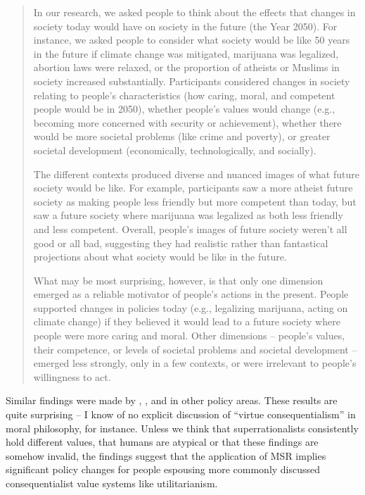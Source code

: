 \begin{quote}
In our research, we asked people to think about the effects that changes
in society today would have on society in the future (the Year 2050).
For instance, we asked people to consider what society would be like 50
years in the future if climate change was mitigated, marijuana was
legalized, abortion laws were relaxed, or the proportion of atheists or
Muslims in society increased substantially. Participants considered
changes in society relating to people's characteristics (how caring,
moral, and competent people would be in 2050), whether people's values
would change (e.g., becoming more concerned with security or
achievement), whether there would be more societal problems (like crime
and poverty), or greater societal development (economically,
technologically, and socially).

The different contexts produced diverse and nuanced images of what
future society would be like. For example, participants saw a more
atheist future society as making people less friendly but more competent
than today, but saw a future society where marijuana was legalized as
both less friendly and less competent. Overall, people's images of
future society weren't all good or all bad, suggesting they had
realistic rather than fantastical projections about what society would
be like in the future.

What may be most surprising, however, is that only one dimension emerged
as a reliable motivator of people's actions in the present. People
supported changes in policies today (e.g., legalizing marijuana, acting
on climate change) if they believed it would lead to a future society
where people were more caring and moral. Other dimensions -- people's
values, their competence, or levels of societal problems and societal
development -- emerged less strongly, only in a few contexts, or were
irrelevant to people's willingness to act.
\end{quote}

Similar findings were made by \parencite{Bain2012-rs},
\parencite{Park2015-bj},
\parencite{Judge2015-mu} and
\parencite{Bain2015-qk} in other policy areas. These results
are quite surprising -- I know of no explicit discussion of ``virtue
consequentialism'' in moral philosophy, for instance. Unless we think
that superrationalists consistently hold different values, that humans
are atypical or that these findings are somehow invalid, the findings
suggest that the application of MSR implies significant policy changes
for people espousing more commonly discussed consequentialist value
systems like utilitarianism.

